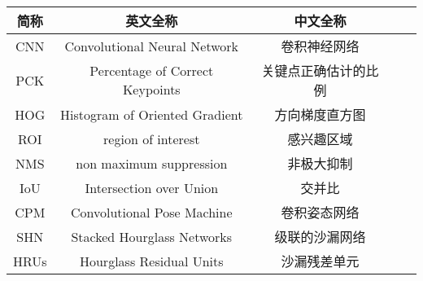 \begin{denotation}
\begin{table}[h]%
\vspace{0.5em}\centering\wuhao
\begin{tabular}{ccccc}
\toprule[1.5pt]
简称&英文全称&中文全称\\
\midrule[1pt]
CNN&Convolutional Neural Network&卷积神经网络\\
PCK&Percentage of Correct Keypoints&关键点正确估计的比例\\
HOG&Histogram of Oriented Gradient&方向梯度直方图\\
ROI&region of interest&感兴趣区域\\
NMS&non maximum suppression&非极大抑制\\
IoU&Intersection over Union&交并比\\
CPM&Convolutional Pose Machine&卷积姿态网络\\
SHN&Stacked Hourglass Networks&级联的沙漏网络\\
HRUs&Hourglass Residual Units&沙漏残差单元\\
\bottomrule[1.5pt]
\end{tabular}
\end{table}
\end{denotation}
